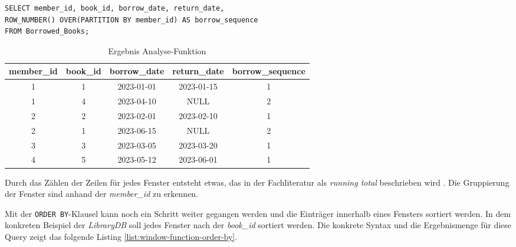 \begin{lstlisting}
SELECT member_id, book_id, borrow_date, return_date,
ROW_NUMBER() OVER(PARTITION BY member_id) AS borrow_sequence
FROM Borrowed_Books;
\end{lstlisting}
\begin{table}[h]
	\centering
	\begin{tabular}{|c|c|c|c|c|}
		\hline
		\textbf{member\_id} & \textbf{book\_id} & \textbf{borrow\_date} & \textbf{return\_date} & \textbf{borrow\_sequence} \\
		\hline
		1                   & 1                 & 2023-01-01            & 2023-01-15            & 1                         \\
		\hline
		1                   & 4                 & 2023-04-10            & NULL                  & 2                         \\
		\hline
		2                   & 2                 & 2023-02-01            & 2023-02-10            & 1                         \\
		\hline
		2                   & 1                 & 2023-06-15            & NULL                  & 2                         \\
		\hline
		3                   & 3                 & 2023-03-05            & 2023-03-20            & 1                         \\
		\hline
		4                   & 5                 & 2023-05-12            & 2023-06-01            & 1                         \\
		\hline
	\end{tabular}
	\caption{Ergebnis Analyse-Funktion}
	\label{tab:ergebnnis_analyse_funktion}
\end{table}

Durch das Zählen der Zeilen für jedes Fenster entsteht etwas, das in der Fachliteratur
als \textit{running total} beschrieben wird \citep[vgl.][S. 37]{Nuijten2023}.
Die Gruppierung der Fenster sind anhand der \textit{member\_id} zu erkennen.

Mit der \texttt{ORDER BY}-Klausel kann noch ein Schritt weiter gegangen werden
und die Einträger innerhalb eines Fensters sortiert werden. In dem konkreten Beispiel
der \textit{LibraryDB} soll jedes Fenster nach der \textit{book\_id} sortiert werden.
Die konkrete Syntax und die Ergebnismenge für diese Query zeigt das folgende Listing
\ref{list:window-function-order-by}.


